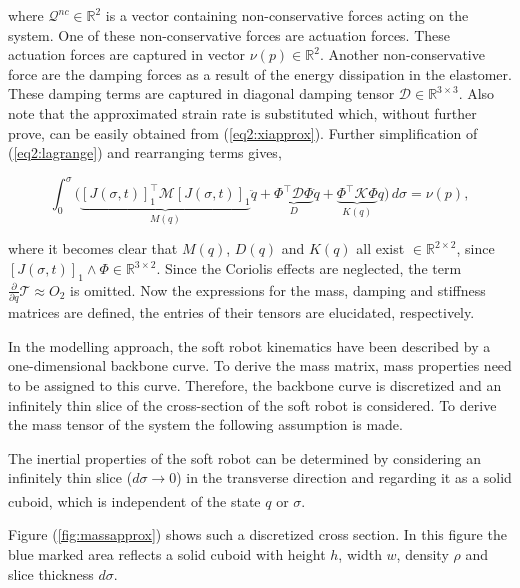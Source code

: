 {where $\mathcal{Q}^{nc} \in \mathbb{R}^2$ is a vector containing non-conservative forces acting on the system. One of these non-conservative forces are actuation forces. These actuation forces are captured in vector $\nu(p) \in \mathbb{R}^2$. Another non-conservative force are the damping forces as a result of the energy dissipation in the elastomer. These damping terms are captured in diagonal damping tensor $\mathcal{D} \in \mathbb{R}^{3 \times 3}$. Also note that the approximated strain rate is substituted which, without further prove, can be easily obtained from (\ref{eq2:xiapprox}). Further simplification of (\ref{eq2:lagrange}) and rearranging terms gives,

\begin{equation}
    \int_0^\sigma \Big( \underbrace{[J(\sigma,t)]_1^\top \mathcal{M} [J(\sigma,t)]_1}_{M(q)} \ddot{q} +  \underbrace{\Phi^\top \mathcal{D} \Phi }_{D} \dot{q}    +   \underbrace{\Phi^\top \mathcal{K} \Phi}_{K(q)} q\Big) \hspace{2pt} d\sigma = \nu(p),
\end{equation}

where it becomes clear that $M(q)$, $D(q)$ and $K(q)$ all exist $\in \mathbb{R}^{2\times2}$, since $[J(\sigma,t)]_1 \land \Phi \in \mathbb{R}^{3 \times 2}$. Since the Coriolis effects are neglected, the term $\frac{\partial}{\partial q}\mathcal{T} \approx O_2 $ is omitted. Now the expressions for the mass, damping and stiffness matrices are defined, the entries of their tensors are elucidated, respectively.

In the modelling approach, the soft robot kinematics have been described by a one-dimensional backbone curve. To derive the mass matrix, mass properties need to be assigned to this curve. Therefore, the backbone curve is discretized and an infinitely thin slice of the cross-section of the soft robot is considered. To derive the mass tensor of the system the following assumption is made.

\begin{theorem}
The inertial properties of the soft robot can be determined by considering an infinitely thin slice ($d \sigma \xrightarrow[]{}0$) in the transverse direction and regarding it as a solid cuboid, which is independent of the state $q$ or $\sigma$.
\end{theorem}

Figure (\ref{fig:massapprox}) shows such a discretized cross section. In this figure the blue marked area reflects a solid cuboid with height $h$, width $w$, density $\rho$ and slice thickness $d\sigma$. 


}
